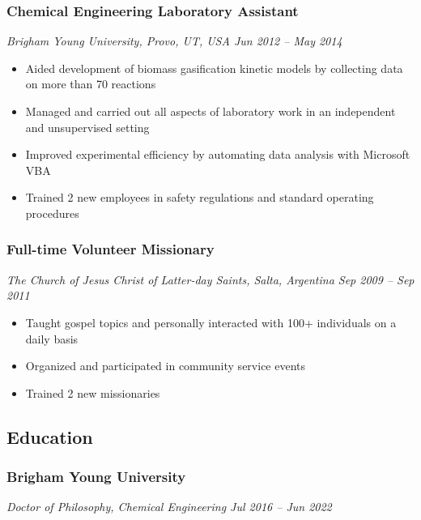 \subsubsection{Chemical Engineering Laboratory
Assistant}\label{chemical-engineering-laboratory-assistant}

\emph{Brigham Young University, Provo, UT, USA \textbar{} Jun 2012 --
May 2014}

\begin{itemize}
\tightlist
\item
  Aided development of biomass gasification kinetic models by collecting
  data on more than 70 reactions
\item
  Managed and carried out all aspects of laboratory work in an
  independent and unsupervised setting
\item
  Improved experimental efficiency by automating data analysis with
  Microsoft VBA
\item
  Trained 2 new employees in safety regulations and standard operating
  procedures
\end{itemize}

\subsubsection{Full-time Volunteer
Missionary}\label{full-time-volunteer-missionary}

\emph{The Church of Jesus Christ of Latter-day Saints, Salta, Argentina
\textbar{} Sep 2009 -- Sep 2011}

\begin{itemize}
\tightlist
\item
  Taught gospel topics and personally interacted with 100+ individuals
  on a daily basis
\item
  Organized and participated in community service events
\item
  Trained 2 new missionaries
\end{itemize}

\subsection{Education}\label{education}

\subsubsection{Brigham Young University}\label{brigham-young-university}

\emph{Doctor of Philosophy, Chemical Engineering \textbar{} Jul 2016 --
Jun 2022}

